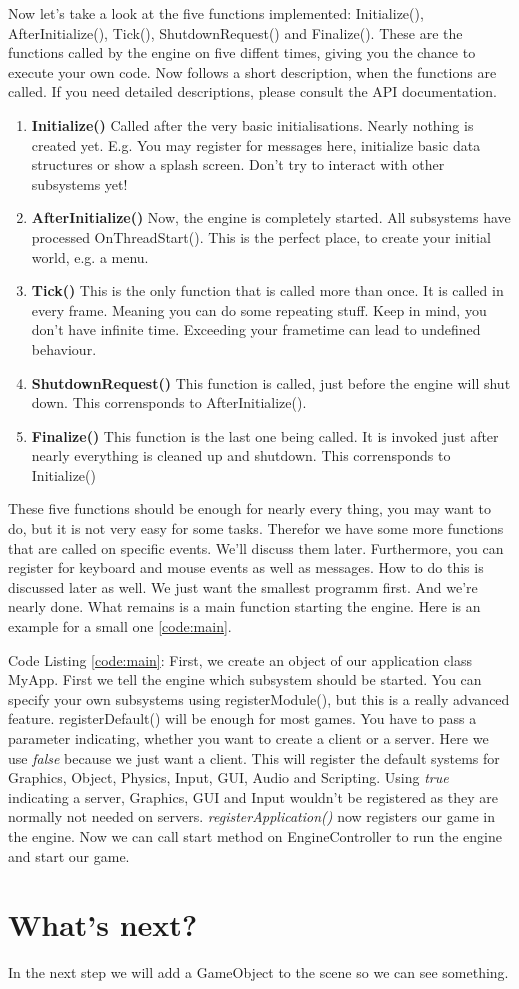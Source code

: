 \documentclass{article}
\begin{document}

Now let's take a look at the five functions implemented: Initialize(), AfterInitialize(), Tick(), ShutdownRequest() and Finalize(). These are the functions called by the engine on five diffent times, giving you the chance to execute your own code. Now follows a short description, when the functions are called. If you need detailed descriptions, please consult the API documentation.
\begin{enumerate}
	\item \textbf{Initialize()} Called after the very basic initialisations. Nearly nothing is created yet. E.g. You may register for messages here, initialize basic data structures or show a splash screen. Don't try to interact with other subsystems yet!
	\item \textbf{AfterInitialize()} Now, the engine is completely started. All subsystems have processed OnThreadStart(). This is the perfect place, to create your initial world, e.g. a menu.
	\item \textbf{Tick()} This is the only function that is called more than once. It is called in every frame. Meaning you can do some repeating stuff. Keep in mind, you don't have infinite time. Exceeding your frametime can lead to undefined behaviour.
	\item \textbf{ShutdownRequest()} This function is called, just before the engine will shut down. This corrensponds to AfterInitialize().
	\item \textbf{Finalize()} This function is the last one being called. It is invoked just after nearly everything is cleaned up and shutdown. This corrensponds to Initialize()
\end{enumerate}
These five functions should be enough for nearly every thing, you may want to do, but it is not very easy for some tasks. Therefor we have some more functions that are called on specific events. We'll discuss them later. Furthermore, you can register for keyboard and mouse events as well as messages. How to do this is discussed later as well. We just want the smallest programm first. And we're nearly done. What remains is a main function starting the engine. Here is an example for a small one \ref{code:main}.

Code Listing \ref{code:main}: First, we create an object of our application class MyApp. First we tell the engine which subsystem should be started. You can specify your own subsystems using registerModule(), but this is a really advanced feature. registerDefault() will be enough for most games. You have to pass a parameter indicating, whether you want to create a client or a server. Here we use \textit{false} because we just want a client. This will register the default systems for Graphics, Object, Physics, Input, GUI, Audio and Scripting. Using \textit{true} indicating a server, Graphics, GUI and Input wouldn't be registered as they are normally not needed on servers. \textit{registerApplication()} now registers our game in the engine. Now we can call start method on EngineController to run the engine and start our game.

\section{What's next?}

In the next step we will add a GameObject to the scene so we can see something.
\end{document}

